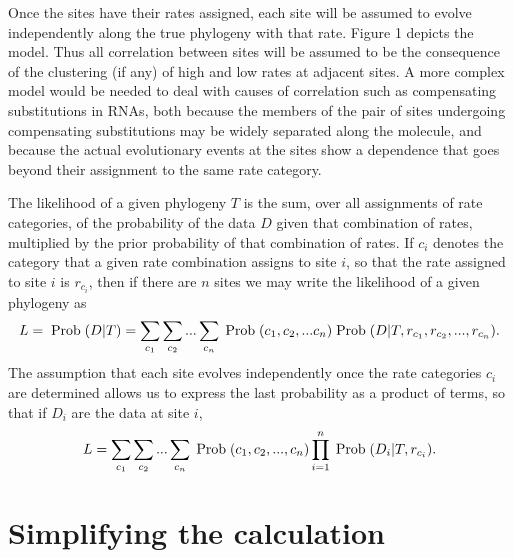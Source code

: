 \documentclass[12pt]{article}
\begin{document}
Once the sites have their rates assigned, each site will be assumed to
evolve independently along the true phylogeny with that rate.  Figure 1
depicts the model.  Thus all
correlation between sites will be assumed to be the consequence of the
clustering (if any) of high and low rates at adjacent sites.  A more complex
model would be needed to deal with
causes of correlation such as compensating substitutions in RNAs,
both because the members of the pair of sites undergoing compensating
substitutions may be widely separated along the molecule, and because the
actual evolutionary events at the sites show a dependence that goes beyond
their assignment to the same rate category.

The likelihood of a given phylogeny $T$ is the sum, over all assignments of
rate categories, of the probability of the data $D$ given that combination of
rates, multiplied by the prior probability of that combination of rates.  If
$c_i$ denotes the category that a given rate combination assigns to site $i$,
so that the rate assigned to site $i$ is $r_{c_i}$, then if there are $n$
sites we may write the
likelihood of a given phylogeny as
\begin{equation} %
L = \prob (D|T) = \sum_{c_1} \sum_{c_2} ... \sum_{c_n} \prob(c_1, c_2, ... c_n) \prob(D|T, r_{c_1}, r_{c_2}, ..., r_{c_n}).
\end{equation}
The assumption that each site evolves independently once
the rate categories $c_i$ are determined allows us to express the last
probability as a product of terms, so that if $D_i$ are the data at site $i$,
\begin{equation} %
L = \sum_{c_1} \sum_{c_2} ... \sum_{c_n} \prob(c_1, c_2, ..., c_n) \prod_{i=1}^n
\prob(D_i|T, r_{c_i}).
\end{equation}

\section*{Simplifying the calculation}
\end{document}
